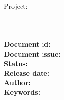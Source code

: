 \documentclass[11pt,a4paper]{letter}
\begin{document}
\pagestyle{empty}



Project: \\
\subdmsproj  - \subdmsdesc \\
\\
\bf \Large \subdmstitle
\\
Document id: \subdmsdocid \\
Document issue: \subdmsissue \\ 
Status: \subdmsstatus \\
Release date: \subdmsrdate \\
Author: \subdmsauthor \\

Keywords: \\
\subdmskeyw \\

\end{document}
